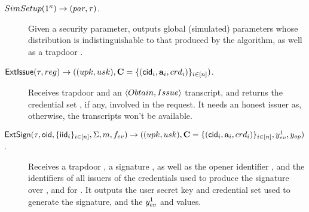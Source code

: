 \begin{description}
\item[$SimSetup(1^\kappa) \rightarrow (par,\tau)$.] Given a security
  parameter, outputs global (simulated) parameters \parm whose distribution is
  indistinguishable to that produced by the \Setup algorithm, as well as a
  trapdoor \trap.
\item[$\mathsf{ExtIssue}(\tau,reg) \rightarrow ((upk,usk),\mathbf{C}=
  \lbrace(\mathsf{cid}_i,\mathbf{a}_i,crd_i) \rbrace_{i \in [n]})$.]
  Receives trapdoor \trap and an $\langle Obtain, Issue \rangle$ transcript,
  and returns the credential set \sCred, if any, involved in the request. It
  needs an honest issuer as, otherwise, the transcripts won't be available. 
\item[$\mathsf{ExtSign}(\tau,\mathsf{oid},\lbrace \mathsf{iid}_i \rbrace_{i \in [n]},\Sigma,m,
  f_{ev}) \rightarrow ((upk,usk),\mathbf{C}=\lbrace(\mathsf{cid}_i,\mathbf{a}_i,crd_i)
  \rbrace_{i \in [n]},y_{ev}^1,y_{op})$.] Receives a trapdoor \trap, a signature
  \Sig, as well as the opener identifier \oid, and the identifiers of all
  issuers of the credentials used to produce the signature over \msg, and for
  \feval. It outputs the user secret key and credential set \sCred used to
  generate the signature, and the $y_{ev}^1$ and \yinsp values.


\end{description}

